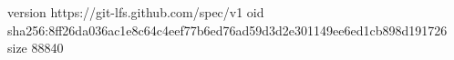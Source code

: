 version https://git-lfs.github.com/spec/v1
oid sha256:8ff26da036ac1e8c64c4eef77b6ed76ad59d3d2e301149ee6ed1cb898d191726
size 88840
